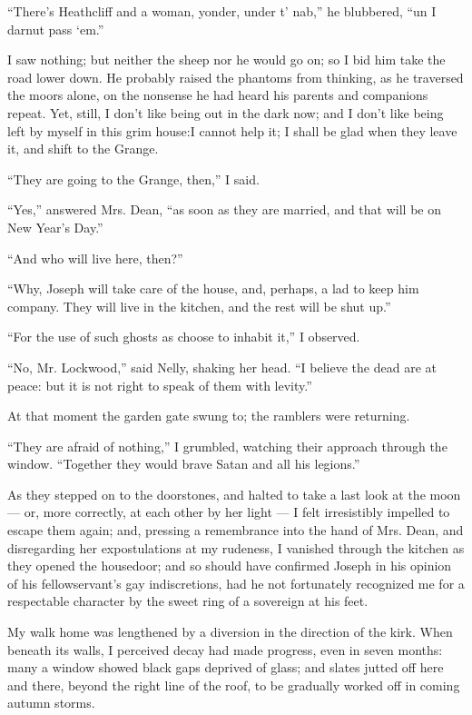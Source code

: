 \par “There's Heathcliff and a woman, yonder, under t' nab,” he blubbered, “un I darnut pass ‘em.”
\par I saw nothing; but neither the sheep nor he would go on; so I bid him take the road lower down. He probably raised the phantoms from thinking, as he traversed the moors alone, on the nonsense he had heard his parents and companions repeat. Yet, still, I don't like being out in the dark now; and I don't like being left by myself in this grim house:I cannot help it; I shall be glad when they leave it, and shift to the Grange.
\par 
\par “They are going to the Grange, then,” I said.
\par “Yes,” answered Mrs. Dean, “as soon as they are married, and that will be on New Year's Day.”
\par “And who will live here, then?”
\par “Why, Joseph will take care of the house, and, perhaps, a lad to keep him company. They will live in the kitchen, and the rest will be shut up.”
\par “For the use of such ghosts as choose to inhabit it,” I observed.
\par “No, Mr. Lockwood,” said Nelly, shaking her head. “I believe the dead are at peace: but it is not right to speak of them with levity.”
\par At that moment the garden gate swung to; the ramblers were returning.
\par “They are afraid of nothing,” I grumbled, watching their approach through the window. “Together they would brave Satan and all his legions.”
\par As they stepped on to the doorstones, and halted to take a last look at the moon — or, more correctly, at each other by her light — I felt irresistibly impelled to escape them again; and, pressing a remembrance into the hand of Mrs. Dean, and disregarding her expostulations at my rudeness, I vanished through the kitchen as they opened the housedoor; and so should have confirmed Joseph in his opinion of his fellowservant's gay indiscretions, had he not fortunately recognized me for a respectable character by the sweet ring of a sovereign at his feet.
\par My walk home was lengthened by a diversion in the direction of the kirk. When beneath its walls, I perceived decay had made progress, even in seven months: many a window showed black gaps deprived of glass; and slates jutted off here and there, beyond the right line of the roof, to be gradually worked off in coming autumn storms.

